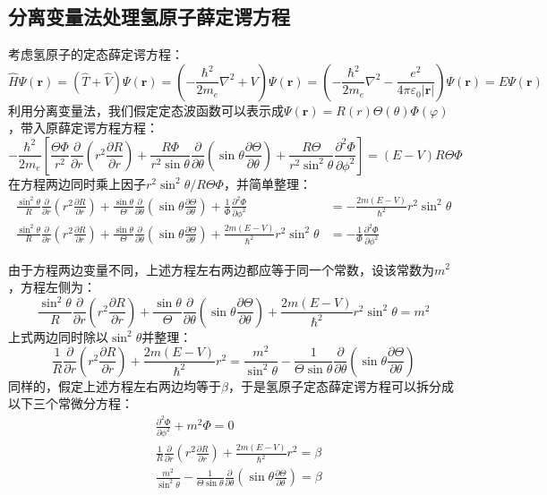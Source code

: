 \subsection{分离变量法处理氢原子薛定谔方程}
考虑氢原子的定态薛定谔方程：
\[\hat{H}\Psi(\mathbf{r})=(\hat{T}+\hat{V})\Psi(\mathbf{r})=\left(-\frac{\hbar^2}{2m_e}\nabla^2+V\right)\Psi(\mathbf{r})=\left(-\frac{\hbar^2}{2m_e}\nabla^2-\frac{e^2}{4\pi\varepsilon_0|\mathbf{r}|}\right)\Psi(\mathbf{r})=E\Psi(\mathbf{r})\]
利用分离变量法，我们假定定态波函数可以表示成$\Psi(\mathbf{r})=R(r)\Theta(\theta)\varPhi(\varphi)$，带入原薛定谔方程方程：
\[-\frac{\hbar^2}{2m_e}\left[\frac{\Theta\varPhi}{r^2}\frac{\partial}{\partial{r}}(r^2\frac{\partial R}{\partial{r}})+\frac{R\varPhi}{r^2\sin\theta}\frac{\partial}{\partial{\theta}}(\sin\theta\frac{\partial \Theta}{\partial{\theta}})+\frac{R\Theta}{r^2\sin^2 \theta }\frac{\partial^2 \varPhi}{\partial{\phi^2}}\right]=(E-V)R\Theta\varPhi\]
在方程两边同时乘上因子$r^2\sin^2 \theta/R\Theta\varPhi$，并简单整理：
\begin{equation*}
\begin{aligned}
\frac{\sin^2 \theta}{R}\frac{\partial}{\partial{r}}(r^2\frac{\partial R}{\partial{r}})+\frac{\sin\theta}{\Theta}\frac{\partial}{\partial{\theta}}(\sin\theta\frac{\partial \Theta}{\partial{\theta}})+\frac{1}{\varPhi}\frac{\partial^2 \varPhi}{\partial{\phi^2}}&=-\frac{2m(E-V)}{\hbar^2}r^2\sin^2 \theta\\
\frac{\sin^2 \theta}{R}\frac{\partial}{\partial{r}}(r^2\frac{\partial R}{\partial{r}})+\frac{\sin\theta}{\Theta}\frac{\partial}{\partial{\theta}}(\sin\theta\frac{\partial \Theta}{\partial{\theta}})+\frac{2m(E-V)}{\hbar^2}r^2\sin^2 \theta&=-\frac{1}{\varPhi}\frac{\partial^2 \varPhi}{\partial{\phi^2}}
\end{aligned}
\end{equation*}

由于方程两边变量不同，上述方程左右两边都应等于同一个常数，设该常数为$m^2$，方程左侧为：
\[\frac{\sin^2 \theta}{R}\frac{\partial}{\partial{r}}(r^2\frac{\partial R}{\partial{r}})+\frac{\sin\theta}{\Theta}\frac{\partial}{\partial{\theta}}(\sin\theta\frac{\partial \Theta}{\partial{\theta}})+\frac{2m(E-V)}{\hbar^2}r^2\sin^2 \theta=m^2\]
上式两边同时除以$\sin^2\theta$并整理：
\[\frac{1}{R}\frac{\partial}{\partial{r}}(r^2\frac{\partial R}{\partial{r}})+\frac{2m(E-V)}{\hbar^2}r^2=\frac{m^2}{\sin^2 \theta}-\frac{1}{\Theta \sin\theta}\frac{\partial}{\partial{\theta}}(\sin\theta\frac{\partial \Theta}{\partial{\theta}})\]
同样的，假定上述方程左右两边均等于$\beta$，于是氢原子定态薛定谔方程可以拆分成以下三个常微分方程：
\begin{subequations}
\begin{align}
&\frac{\partial^2 \varPhi}{\partial{\phi^2}}+m^2\varPhi=0 \label{eq:1.17_a}\\
&\frac{1}{R}\frac{\partial}{\partial{r}}(r^2\frac{\partial R}{\partial{r}})+\frac{2m(E-V)}{\hbar^2}r^2=\beta \label{eq:1.17_b}\\
&\frac{m^2}{\sin^2 \theta}-\frac{1}{\Theta \sin\theta}\frac{\partial}{\partial{\theta}}(\sin\theta\frac{\partial \Theta}{\partial{\theta}})=\beta \label{eq:1.17_c}
\end{align}
\end{subequations}


